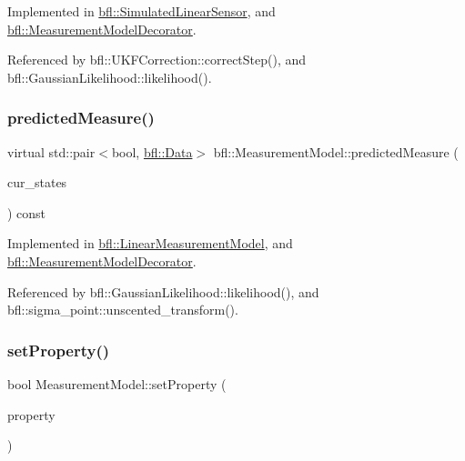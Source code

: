 Implemented in \mbox{\hyperlink{classbfl_1_1SimulatedLinearSensor_a61c278bdbc5f3a0201d2f855a739d4f4}{bfl\+::\+Simulated\+Linear\+Sensor}}, and \mbox{\hyperlink{classbfl_1_1MeasurementModelDecorator_a36194c2f6abd7e13a417c3663febe921}{bfl\+::\+Measurement\+Model\+Decorator}}.



Referenced by bfl\+::\+U\+K\+F\+Correction\+::correct\+Step(), and bfl\+::\+Gaussian\+Likelihood\+::likelihood().

\mbox{\label{classbfl_1_1MeasurementModel_a8fc8798aa2db48f428d4ce59b33b5307}} 
\subsubsection{\texorpdfstring{predicted\+Measure()}{predictedMeasure()}}
{\footnotesize\ttfamily virtual std\+::pair$<$bool, \mbox{\hyperlink{namespacebfl_af6b103c6821db1b54452f776fdd9dd02}{bfl\+::\+Data}}$>$ bfl\+::\+Measurement\+Model\+::predicted\+Measure (\begin{DoxyParamCaption}\item[{const Eigen\+::\+Ref$<$ const Eigen\+::\+Matrix\+Xd $>$ \&}]{cur\+\_\+states }\end{DoxyParamCaption}) const\hspace{0.3cm}{\ttfamily [pure virtual]}}



Implemented in \mbox{\hyperlink{classbfl_1_1LinearMeasurementModel_a8831b8acb4790db4c69db73200375c69}{bfl\+::\+Linear\+Measurement\+Model}}, and \mbox{\hyperlink{classbfl_1_1MeasurementModelDecorator_ae4b5f665c511cb0fddaaf0a3de402f22}{bfl\+::\+Measurement\+Model\+Decorator}}.



Referenced by bfl\+::\+Gaussian\+Likelihood\+::likelihood(), and bfl\+::sigma\+\_\+point\+::unscented\+\_\+transform().

\mbox{\label{classbfl_1_1MeasurementModel_af97e18b52d1a3f365dd5982b8cc4aff7}} 
\subsubsection{\texorpdfstring{set\+Property()}{setProperty()}}
{\footnotesize\ttfamily bool Measurement\+Model\+::set\+Property (\begin{DoxyParamCaption}\item[{const std\+::string \&}]{property }\end{DoxyParamCaption})\hspace{0.3cm}{\ttfamily [virtual]}}



